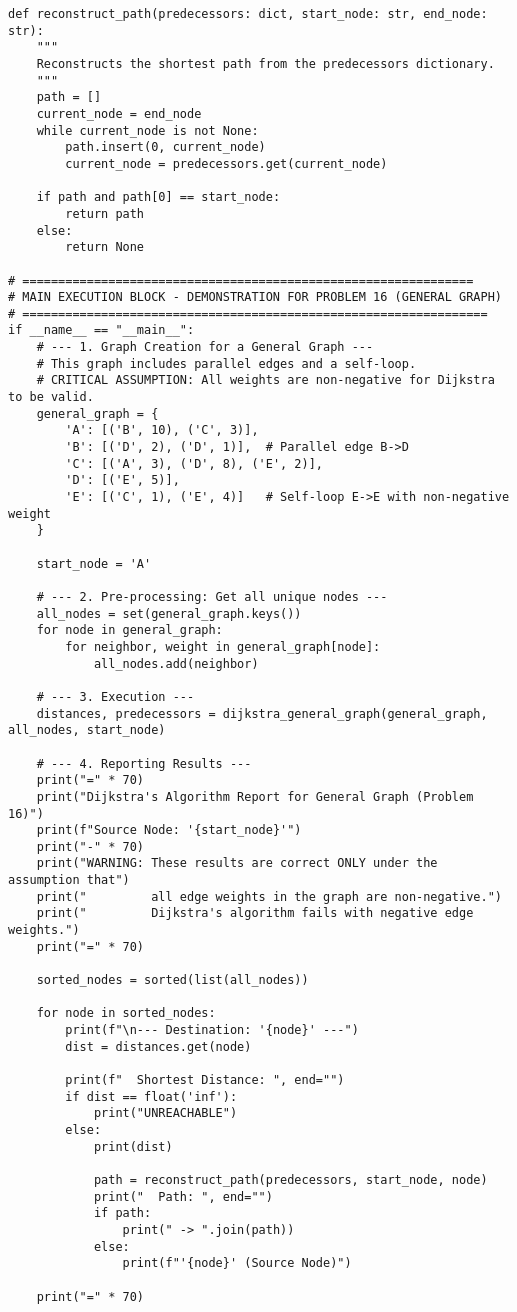 \documentclass[a4paper,12pt]{article}
\begin{document}
\begin{lstlisting}[style=pythonstyle, caption={Cài đặt Dijkstra cho đồ thị tổng quát (chỉ trọng số không âm).}, label={lst:python_16}]
def reconstruct_path(predecessors: dict, start_node: str, end_node: str):
    """
    Reconstructs the shortest path from the predecessors dictionary.
    """
    path = []
    current_node = end_node
    while current_node is not None:
        path.insert(0, current_node)
        current_node = predecessors.get(current_node)
    
    if path and path[0] == start_node:
        return path
    else:
        return None

# ===============================================================
# MAIN EXECUTION BLOCK - DEMONSTRATION FOR PROBLEM 16 (GENERAL GRAPH)
# =================================================================
if __name__ == "__main__":
    # --- 1. Graph Creation for a General Graph ---
    # This graph includes parallel edges and a self-loop.
    # CRITICAL ASSUMPTION: All weights are non-negative for Dijkstra to be valid.
    general_graph = {
        'A': [('B', 10), ('C', 3)],
        'B': [('D', 2), ('D', 1)],  # Parallel edge B->D
        'C': [('A', 3), ('D', 8), ('E', 2)],
        'D': [('E', 5)],
        'E': [('C', 1), ('E', 4)]   # Self-loop E->E with non-negative weight
    }

    start_node = 'A'

    # --- 2. Pre-processing: Get all unique nodes ---
    all_nodes = set(general_graph.keys())
    for node in general_graph:
        for neighbor, weight in general_graph[node]:
            all_nodes.add(neighbor)

    # --- 3. Execution ---
    distances, predecessors = dijkstra_general_graph(general_graph, all_nodes, start_node)

    # --- 4. Reporting Results ---
    print("=" * 70)
    print("Dijkstra's Algorithm Report for General Graph (Problem 16)")
    print(f"Source Node: '{start_node}'")
    print("-" * 70)
    print("WARNING: These results are correct ONLY under the assumption that")
    print("         all edge weights in the graph are non-negative.")
    print("         Dijkstra's algorithm fails with negative edge weights.")
    print("=" * 70)

    sorted_nodes = sorted(list(all_nodes))

    for node in sorted_nodes:
        print(f"\n--- Destination: '{node}' ---")
        dist = distances.get(node)
        
        print(f"  Shortest Distance: ", end="")
        if dist == float('inf'):
            print("UNREACHABLE")
        else:
            print(dist)
            
            path = reconstruct_path(predecessors, start_node, node)
            print("  Path: ", end="")
            if path:
                print(" -> ".join(path))
            else:
                print(f"'{node}' (Source Node)")

    print("=" * 70)
\end{lstlisting}
\end{document}

